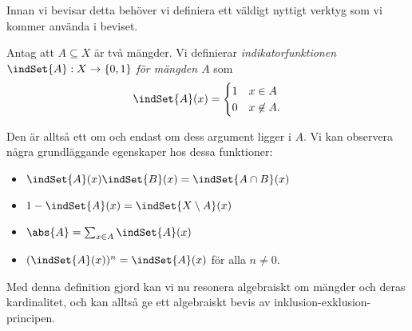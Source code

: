 \documentclass[nobib]{tufte-handout}
\begin{document}
Innan vi bevisar detta behöver vi definiera ett väldigt nyttigt verktyg som vi kommer använda i beviset.

\begin{definition}
  Antag att $A \subseteq X$ är två mängder. Vi definierar \emph{indikatorfunktionen} $\indSet{A}: X \to \{0,1\}$ \emph{för mängden $A$} som
  $$\indSet{A}(x) = \begin{cases}
    1  & x \in A \\
    0 & x \not\in A.
  \end{cases}$$

  Den är alltså ett om och endast om dess argument ligger i $A$. Vi kan observera några grundläggande egenskaper hos dessa funktioner:
  \begin{itemize}
    \item $\indSet{A}(x)\indSet{B}(x) = \indSet{A\cap B}(x)$
    \item $1 - \indSet{A}(x) = \indSet{X \setminus A}(x)$
    \item $\abs{A} = \sum_{x \in A} \indSet{A}(x)$
    \item $(\indSet{A}(x))^n = \indSet{A}(x)$ för alla $n \neq 0$.
  \end{itemize}
\end{definition}

Med denna definition gjord kan vi nu resonera algebraiskt om mängder och deras kardinalitet, och kan alltså ge ett algebraiskt bevis av inklusion-exklusion-principen.
\end{document}
